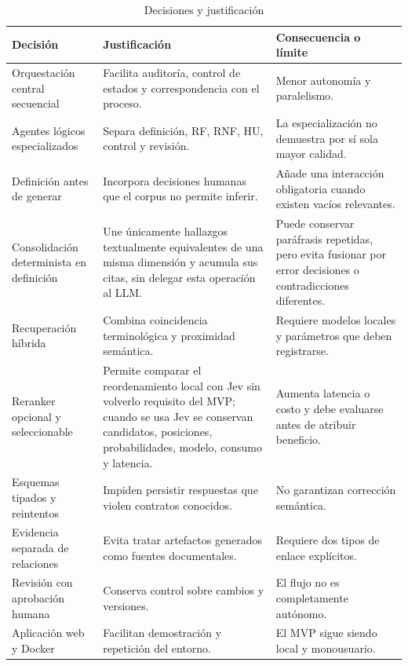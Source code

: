 \begin{table}[H]
  \centering
  \caption{Decisiones y justificación}
  \label{tab:decisiones-arquitectura}
  \small
  \begin{tabularx}{\textwidth}{p{3.7cm}YY}
    \toprule
    Decisión & Justificación & Consecuencia o límite \\
    \midrule
    Orquestación central secuencial & Facilita auditoría, control de estados y correspondencia con el proceso. & Menor autonomía y paralelismo. \\
    Agentes lógicos especializados & Separa definición, RF, RNF, HU, control y revisión. & La especialización no demuestra por sí sola mayor calidad. \\
    Definición antes de generar & Incorpora decisiones humanas que el corpus no permite inferir. & Añade una interacción obligatoria cuando existen vacíos relevantes. \\
    Consolidación determinista en definición & Une únicamente hallazgos textualmente equivalentes de una misma dimensión y acumula sus citas, sin delegar esta operación al LLM. & Puede conservar paráfrasis repetidas, pero evita fusionar por error decisiones o contradicciones diferentes. \\
    Recuperación híbrida & Combina coincidencia terminológica y proximidad semántica. & Requiere modelos locales y parámetros que deben registrarse. \\
    Reranker opcional y seleccionable & Permite comparar el reordenamiento local con Jev sin volverlo requisito del MVP; cuando se usa Jev se conservan candidatos, posiciones, probabilidades, modelo, consumo y latencia. & Aumenta latencia o costo y debe evaluarse antes de atribuir beneficio. \\
    Esquemas tipados y reintentos & Impiden persistir respuestas que violen contratos conocidos. & No garantizan corrección semántica. \\
    Evidencia separada de relaciones & Evita tratar artefactos generados como fuentes documentales. & Requiere dos tipos de enlace explícitos. \\
    Revisión con aprobación humana & Conserva control sobre cambios y versiones. & El flujo no es completamente autónomo. \\
    Aplicación web y Docker & Facilitan demostración y repetición del entorno. & El MVP sigue siendo local y monousuario. \\
    \bottomrule
  \end{tabularx}
\end{table}

